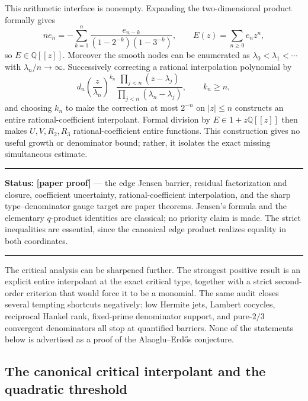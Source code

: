 \documentclass[11pt,oneside]{article}
\theoremstyle{definition}
\theoremstyle{remark}
\newcommand{\Q}{\mathbb Q}
\newcommand{\statusnew}{\textcolor{newgreen}{\textbf{[paper proof]}}}
\newenvironment{statusbox}[1]
{\begin{center}\begin{minipage}{0.94\textwidth}\raggedright\hbadness=10000\hrule
\vspace{0.45em}\textbf{Status:} #1\par\vspace{0.35em}}
{\vspace{0.35em}\hrule\end{minipage}\end{center}}
\begin{document}
This arithmetic interface is nonempty.  Expanding the two-dimensional product formally gives
\begin{equation}
 ne_n=-\sum_{k=1}^n
 \frac{e_{n-k}}{(1-2^{-k})(1-3^{-k})},
 \qquad E(z)=\sum_{n\ge0}e_nz^n,
 \label{crit:eq-rational-product-recurrence}
\end{equation}
so $E\in\Q[[z]]$.  Moreover the smooth nodes can be enumerated as
$\lambda_0<\lambda_1<\cdots$ with $\lambda_n/n\to\infty$.  Successively correcting a
rational interpolation polynomial by
\[
 d_n\left(\frac z{\lambda_n}\right)^{k_n}
 \frac{\prod_{j<n}(z-\lambda_j)}{\prod_{j<n}(\lambda_n-\lambda_j)},
 \qquad k_n\ge n,
\]
and choosing $k_n$ to make the correction at most $2^{-n}$ on $|z|\le n$ constructs an
entire rational-coefficient interpolant.  Formal division by $E\in1+z\Q[[z]]$ then makes
$U,V,R_2,R_3$ rational-coefficient entire functions.  This construction gives no useful
growth or denominator bound; rather, it isolates the exact missing simultaneous estimate.

\begin{statusbox}{\statusnew{} --- the edge Jensen barrier, residual factorization and
closure, coefficient uncertainty, rational-coefficient interpolation, and the sharp
type--denominator gauge target are paper theorems.  Jensen's formula and the elementary
$q$-product identities are classical; no priority claim is made.  The strict inequalities
are essential, since the canonical edge product realizes equality in both coordinates.}
\end{statusbox}

The critical analysis can be sharpened further.  The strongest positive result is an explicit
entire interpolant at the exact critical type, together with a
strict second-order criterion that would force it to be a monomial.  The same audit closes
several tempting shortcuts negatively: low Hermite jets, Lambert cocycles, reciprocal Hankel
rank, fixed-prime denominator support, and pure-$2/3$ convergent denominators all stop at
quantified barriers.  None of the statements below is advertised as a proof of the
Alaoglu--Erd\H{o}s conjecture.

\subsection{The canonical critical interpolant and the quadratic threshold}
\label{crit:critical-interpolant}
\end{document}
